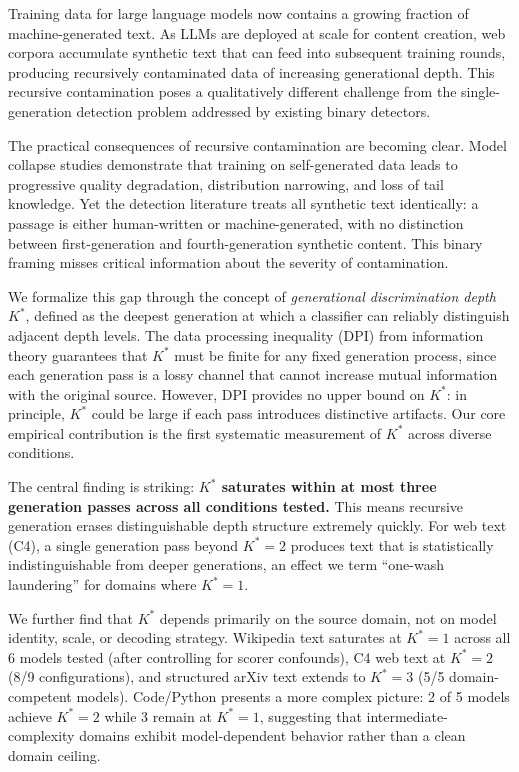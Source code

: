 \documentclass[11pt]{article}
\newcommand{\kstar}{K^*}
\begin{document}
Training data for large language models now contains a growing fraction of machine-generated text.
As LLMs are deployed at scale for content creation, web corpora accumulate synthetic text that can feed into subsequent training rounds, producing recursively contaminated data of increasing generational depth.
This recursive contamination poses a qualitatively different challenge from the single-generation detection problem addressed by existing binary detectors.

The practical consequences of recursive contamination are becoming clear.
Model collapse studies \citep{shumailov2024ai,alemohammad2024selfconsuming,dohmatob2024tale} demonstrate that training on self-generated data leads to progressive quality degradation, distribution narrowing, and loss of tail knowledge.
Yet the detection literature treats all synthetic text identically: a passage is either human-written or machine-generated, with no distinction between first-generation and fourth-generation synthetic content.
This binary framing misses critical information about the severity of contamination.

We formalize this gap through the concept of \emph{generational discrimination depth} $\kstar$, defined as the deepest generation at which a classifier can reliably distinguish adjacent depth levels.
The data processing inequality (DPI) from information theory guarantees that $\kstar$ must be finite for any fixed generation process, since each generation pass is a lossy channel that cannot increase mutual information with the original source.
However, DPI provides no upper bound on $\kstar$: in principle, $\kstar$ could be large if each pass introduces distinctive artifacts.
Our core empirical contribution is the first systematic measurement of $\kstar$ across diverse conditions.

The central finding is striking: \textbf{$\kstar$ saturates within at most three generation passes across all conditions tested.}
This means recursive generation erases distinguishable depth structure extremely quickly.
For web text (C4), a single generation pass beyond $\kstar{=}2$ produces text that is statistically indistinguishable from deeper generations, an effect we term ``one-wash laundering'' for domains where $\kstar{=}1$.

We further find that $\kstar$ depends primarily on the source domain, not on model identity, scale, or decoding strategy.
Wikipedia text saturates at $\kstar{=}1$ across all 6 models tested (after controlling for scorer confounds), C4 web text at $\kstar{=}2$ (8/9 configurations), and structured arXiv text extends to $\kstar{=}3$ (5/5 domain-competent models).
Code/Python presents a more complex picture: 2 of 5 models achieve $\kstar{=}2$ while 3 remain at $\kstar{=}1$, suggesting that intermediate-complexity domains exhibit model-dependent behavior rather than a clean domain ceiling.
\end{document}
